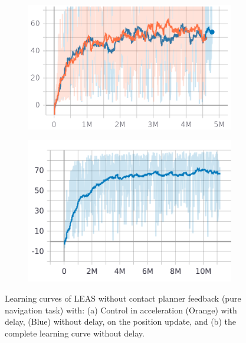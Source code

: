 \begin{figure}
    \centering
    \begin{subfigure}[t]{0.49\linewidth}
    \includegraphics[width=\textwidth]{Figures/Chapter_LEAS/learning_curves_P1.png}
    \caption{}
    \end{subfigure}
    \begin{subfigure}[t]{0.49\linewidth}
    \includegraphics[width=\textwidth]{Figures/Chapter_LEAS/learning_curve_leas_p1.png}
    \caption{}
    \end{subfigure}
    \caption{Learning curves of LEAS without contact planner feedback (pure navigation task) with: (a) Control in acceleration (Orange) with delay, (Blue) without delay, on the position update, and (b) the complete learning curve without delay.}
    \label{fig:control_LEAS_learning_curves}
\end{figure}

